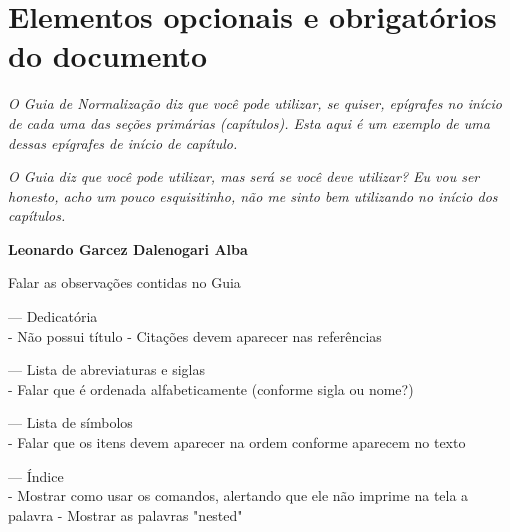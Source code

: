\chapter{Elementos opcionais e obrigatórios do documento}
\hspace{\fill}
\begin{minipage}{6cm}
    \begin{singlespace} %
        \textit{O Guia de Normalização diz que você pode utilizar, se quiser, epígrafes no início de cada uma das seções primárias (capítulos). Esta aqui é um exemplo de uma dessas epígrafes de início de capítulo.} 
        
        \textit{O Guia diz que você pode utilizar, mas será se você deve utilizar? Eu vou ser honesto, acho um pouco esquisitinho, não me sinto bem utilizando no início dos capítulos.}
        
        \textbf{Leonardo Garcez Dalenogari Alba}
    \end{singlespace}
\end{minipage}

Falar as observações contidas no Guia

--- Dedicatória\\
    - Não possui título
    - Citações devem aparecer nas referências

--- Lista de abreviaturas e siglas\\
    - Falar que é ordenada alfabeticamente (conforme sigla ou nome?)

--- Lista de símbolos\\
    - Falar que os itens devem aparecer na ordem conforme aparecem no texto

--- Índice\\
    - Mostrar como usar os comandos, alertando que ele não imprime na tela a palavra
    - Mostrar as palavras "nested"
